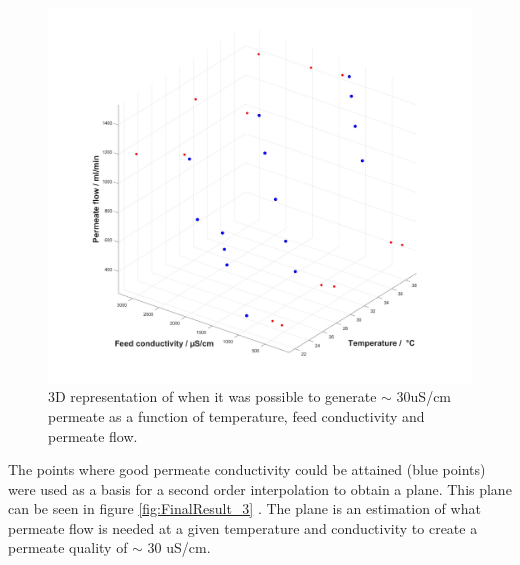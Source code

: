 \begin{figure}[H]
    \centering
    \includegraphics[width=1.1\textwidth]{FinalResult_2}
    \caption{3D representation of when it was possible to generate $\sim$ 30uS/cm permeate as a function of temperature, feed conductivity and permeate flow.}
    \label{fig:FinalResult_2}
\end{figure}

\newpage

The points where good permeate conductivity could be attained (blue points) were used as a basis for a second order interpolation to obtain a plane. This plane can be seen in figure \ref{fig:FinalResult_3} . The plane is an estimation of what permeate flow is needed at a given temperature and conductivity to create a permeate quality of  $\sim$ 30 uS/cm. 

